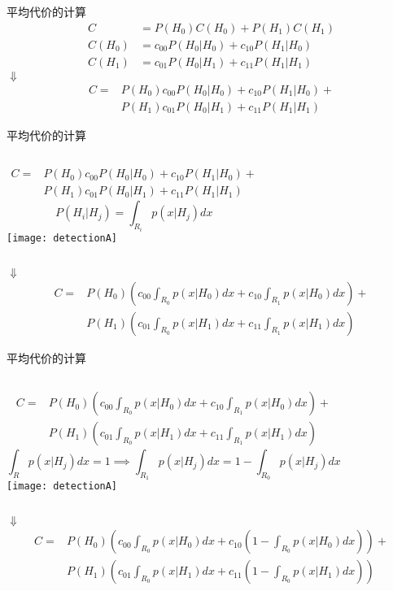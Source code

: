 \begin{frame}{平均代价的计算}
\begin{align*}
C&=P(H_0)C(H_0)+P(H_1)C(H_1)\\
C(H_0)&=c_{00}P(H_0|H_0)+c_{10}P(H_1|H_0)\\
C(H_1)&=c_{01}P(H_0|H_1)+c_{11}P(H_1|H_1)
\end{align*}
\centering $\Downarrow$
\begin{align*}
C=&P(H_0)c_{00}P(H_0|H_0)+c_{10}P(H_1|H_0)+\\
&P(H_1)c_{01}P(H_0|H_1)+c_{11}P(H_1|H_1)
\end{align*}
\end{frame}

\begin{frame}[shrink]{平均代价的计算}
\begin{columns}
	\begin{align*}
	C=&P(H_0)c_{00}P(H_0|H_0)+c_{10}P(H_1|H_0)+\\
	&P(H_1)c_{01}P(H_0|H_1)+c_{11}P(H_1|H_1)
	\end{align*}
	\[ P(H_i|H_j)=\int_{R_i}p(x|H_j)dx\]
	\texttt{[image: detectionA]}
\end{columns}

\medskip
\centering $\Downarrow$
\begin{align*}
C=&P(H_0)\left(c_{00}\int_{R_0}p(x|H_0)dx+c_{10}\int_{R_1}p(x|H_0)dx\right)+\\
&P(H_1)\left(c_{01}\int_{R_0}p(x|H_1)dx+c_{11}\int_{R_1}p(x|H_1)dx\right)
\end{align*}

\end{frame}

\begin{frame}[shrink]{平均代价的计算}
\begin{columns}
	\begin{align*}
	C=&P(H_0)\left(c_{00}\int_{R_0}p(x|H_0)dx+c_{10}\int_{R_1}p(x|H_0)dx\right)+\\
	&P(H_1)\left(c_{01}\int_{R_0}p(x|H_1)dx+c_{11}\int_{R_1}p(x|H_1)dx\right)
	\end{align*}
	\[\int_{R}p(x|H_j)dx=1 \implies \int_{R_1}p(x|H_j)dx=1-\int_{R_0}p(x|H_j)dx \]
	\texttt{[image: detectionA]}
\end{columns}

\medskip
\centering $\Downarrow$
\begin{align*}
C=&P(H_0)\left(c_{00}\int_{R_0}p(x|H_0)dx+c_{10}\left(1-\int_{R_0}p(x|H_0)dx\right)\right)+\\
&P(H_1)\left(c_{01}\int_{R_0}p(x|H_1)dx+c_{11}\left(1-\int_{R_0}p(x|H_1)dx\right)\right)
\end{align*}
\end{frame}

